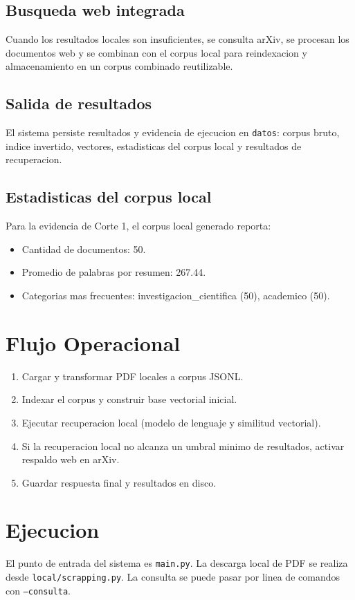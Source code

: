 \documentclass[runningheads]{llncs}
\begin{document}
\subsection{Busqueda web integrada}
Cuando los resultados locales son insuficientes, se consulta arXiv, se
procesan los documentos web y se combinan con el corpus local para
reindexacion y almacenamiento en un corpus combinado reutilizable.

\subsection{Salida de resultados}
El sistema persiste resultados y evidencia de ejecucion en \texttt{datos}:
corpus bruto, indice invertido, vectores, estadisticas del corpus local y
resultados de recuperacion.

\subsection{Estadisticas del corpus local}
Para la evidencia de Corte 1, el corpus local generado reporta:
\begin{itemize}
\item Cantidad de documentos: 50.
\item Promedio de palabras por resumen: 267.44.
\item Categorias mas frecuentes: investigacion\_cientifica (50), academico (50).
\end{itemize}

\section{Flujo Operacional}
\begin{enumerate}
\item Cargar y transformar PDF locales a corpus JSONL.
\item Indexar el corpus y construir base vectorial inicial.
\item Ejecutar recuperacion local (modelo de lenguaje y similitud vectorial).
\item Si la recuperacion local no alcanza un umbral minimo de resultados,
activar respaldo web en arXiv.
\item Guardar respuesta final y resultados en disco.
\end{enumerate}

\section{Ejecucion}
El punto de entrada del sistema es \texttt{main.py}. La descarga local de PDF
se realiza desde \texttt{local/scrapping.py}. La consulta se puede pasar por
linea de comandos con \texttt{--consulta}.
\end{document}
